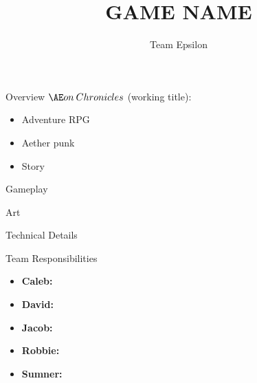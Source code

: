 \documentclass{teamepsilon}
\title{GAME NAME}
\author{Team Epsilon}
\institute{Colorado School of Mines}
\begin{document}
\begin{frame}{Overview}
	$\AE on\:Chronicles$ (working title):\\
	\begin{itemize}
		\item Adventure RPG
		\item Aether punk
		\item Story
	\end{itemize}
\end{frame}

\begin{frame}{Gameplay}
	
\end{frame}

\begin{frame}{Art}

\end{frame}

\begin{frame}{Technical Details}

\end{frame}

\begin{frame}{Team Responsibilities}
    \begin{itemize}
        \item \textbf{Caleb:}
        \item \textbf{David:}
        \item \textbf{Jacob:}
        \item \textbf{Robbie:}
        \item \textbf{Sumner:}
    \end{itemize}
\end{frame}
\end{document}
